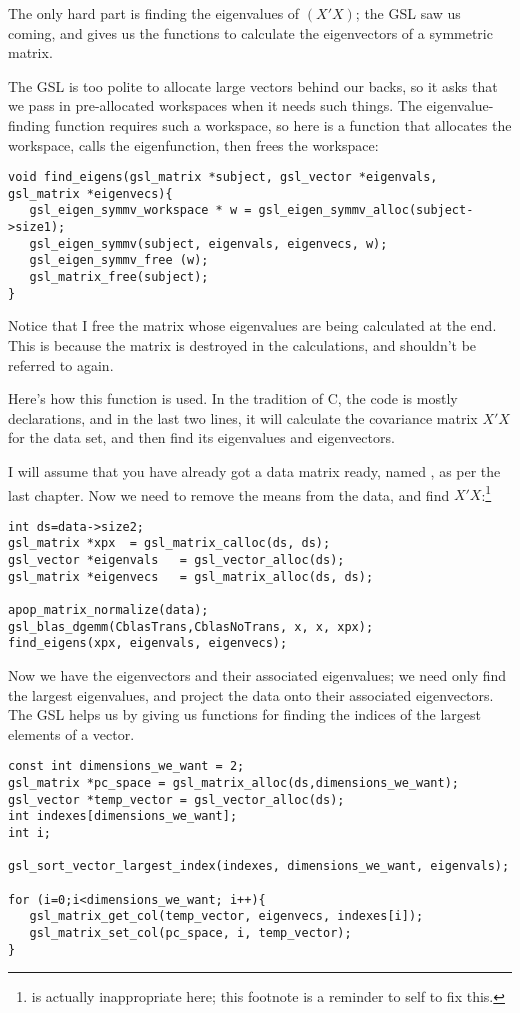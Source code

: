 The only hard part is finding the eigenvalues of
$(X'X)$; the GSL saw us coming, and gives us the  functions
to calculate the eigenvectors of a symmetric matrix.

The GSL is too polite to allocate large vectors behind our backs, so
it asks that we pass in pre-allocated workspaces when it needs such
things. The eigenvalue-finding function requires such a workspace, so
here is a function that allocates the workspace, calls the eigenfunction,
then frees the workspace:
\begin{lstlisting}
void find_eigens(gsl_matrix *subject, gsl_vector *eigenvals, gsl_matrix *eigenvecs){
   gsl_eigen_symmv_workspace * w = gsl_eigen_symmv_alloc(subject->size1);
   gsl_eigen_symmv(subject, eigenvals, eigenvecs, w);
   gsl_eigen_symmv_free (w);
   gsl_matrix_free(subject);
}
\end{lstlisting}

Notice that I free the matrix whose eigenvalues are being calculated at the end.
This is because the matrix is destroyed in the
calculations, and shouldn't be referred to again. 

Here's how this function is used. In the tradition of C, the code is
mostly declarations, and in the last two lines, it will calculate the
covariance matrix $X'X$ for the data set, and then find its eigenvalues
and eigenvectors.

I will assume that you have already got a data matrix ready, named
, as per the last chapter. Now we need to remove the means
from the data, and find $X'X$:\footnote{
is actually inappropriate here; this footnote is a reminder to self to
fix this.}

\begin{lstlisting}
int ds=data->size2;
gsl_matrix *xpx  = gsl_matrix_calloc(ds, ds);
gsl_vector *eigenvals   = gsl_vector_alloc(ds);
gsl_matrix *eigenvecs   = gsl_matrix_alloc(ds, ds);

apop_matrix_normalize(data);
gsl_blas_dgemm(CblasTrans,CblasNoTrans, x, x, xpx);
find_eigens(xpx, eigenvals, eigenvecs);
\end{lstlisting}

Now we have the eigenvectors and their associated eigenvalues; we need only find
the largest eigenvalues, and project the data onto their associated eigenvectors.
The GSL helps us by giving us functions for
finding the indices of the largest elements of a vector.
\begin{lstlisting}
const int dimensions_we_want = 2;
gsl_matrix *pc_space = gsl_matrix_alloc(ds,dimensions_we_want);
gsl_vector *temp_vector = gsl_vector_alloc(ds);
int indexes[dimensions_we_want];
int i;

gsl_sort_vector_largest_index(indexes, dimensions_we_want, eigenvals);

for (i=0;i<dimensions_we_want; i++){
   gsl_matrix_get_col(temp_vector, eigenvecs, indexes[i]);
   gsl_matrix_set_col(pc_space, i, temp_vector);
}
\end{lstlisting}

